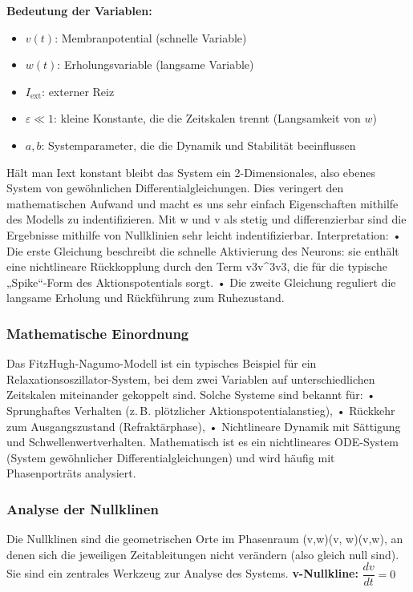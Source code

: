 \begin{refsection}
\textbf{Bedeutung der Variablen:}

\begin{itemize}
	\item $v(t)$: Membranpotential (schnelle Variable)
	\item $w(t)$: Erholungsvariable (langsame Variable)
	\item $I_{\text{ext}}$: externer Reiz
	\item $\varepsilon \ll 1$: kleine Konstante, die die Zeitskalen trennt (Langsamkeit von $w$)
	\item $a, b$: Systemparameter, die die Dynamik und Stabilität beeinflussen
\end{itemize}
Hält man Iext konstant bleibt das System ein 2-Dimensionales, also ebenes System von gewöhnlichen Differentialgleichungen. Dies veringert den mathematischen Aufwand und macht es uns sehr einfach Eigenschaften mithilfe des Modells zu indentifizieren.
Mit w und v als stetig und differenzierbar sind die Ergebnisse mithilfe von Nullklinien sehr leicht indentifizierbar.
Interpretation:
•	Die erste Gleichung beschreibt die schnelle Aktivierung des Neurons: sie enthält eine nichtlineare Rückkopplung durch den Term v3v^3v3, die für die typische „Spike“-Form des Aktionspotentials sorgt.
•	Die zweite Gleichung reguliert die langsame Erholung und Rückführung zum Ruhezustand.
\subsubsection{Mathematische Einordnung}
Das FitzHugh-Nagumo-Modell ist ein typisches Beispiel für ein Relaxationsoszillator-System, bei dem zwei Variablen auf unterschiedlichen Zeitskalen miteinander gekoppelt sind. Solche Systeme sind bekannt für:
•	Sprunghaftes Verhalten (z. B. plötzlicher Aktionspotentialanstieg),
•	Rückkehr zum Ausgangszustand (Refraktärphase),
•	Nichtlineare Dynamik mit Sättigung und Schwellenwertverhalten.
Mathematisch ist es ein nichtlineares ODE-System (System gewöhnlicher Differentialgleichungen) und wird häufig mit Phasenporträts analysiert.
\subsubsection{Analyse der Nullklinen}
Die Nullklinen sind die geometrischen Orte im Phasenraum (v,w)(v, w)(v,w), an denen sich die jeweiligen Zeitableitungen nicht verändern (also gleich null sind). Sie sind ein zentrales Werkzeug zur Analyse des Systems.
\textbf{v-Nullkline:} $\dfrac{dv}{dt} = 0$


\end{refsection}
